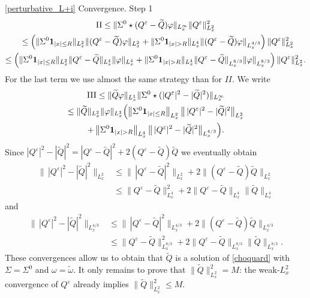 \begin{ProofOf}{\eqref{perturbative_L+i} Convergence. Step 1}
\bgroup
{}
\begin{multline*}
\textup{II}\leq\|\Sigma^{0}\star(Q^{\varepsilon}-\widetilde{Q})\varphi\|_{L_{x}^{\infty}}\|Q^{\varepsilon}\|_{L_{x}^{2}}^{2}\\
\shoveleft{\hphantom{\textup{II}}\leq\left(\|\Sigma^{0}\mathbf{1}_{|x|\leq R}\|_{L_{x}^{2}}\|(Q^{\varepsilon}-\widetilde{Q})\varphi\|_{L_{x}^{2}}+\|\Sigma^{0}\mathbf{1}_{|x|>R}\|_{L_{x}^{4}}\|(Q^{\varepsilon}-\widetilde{Q})\varphi\|_{L_{x}^{4/3}}\right)\|Q^{\varepsilon}\|_{L_{x}^{2}}^{2}}\\
\leq\left(\|\Sigma^{0}\mathbf{1}_{|x|\leq R}\|_{L_{x}^{2}}\|Q^{\varepsilon}-\widetilde{Q}\|_{L_{x}^{4}}\|\varphi\|_{L_{x}^{4}}+\|\Sigma^{0}\mathbf{1}_{|x|>R}\|_{L_{x}^{4}}\|Q^{\varepsilon}-\widetilde{Q}\|_{L_{x}^{8/3}}\|\varphi\|_{L_{x}^{8/3}}\right)\|Q^{\varepsilon}\|_{L_{x}^{2}}^{2}.
\end{multline*}
\egroup
For the last term we use almost the same strategy than for $II$. We write
\begin{multline*}
\textup{III}\leq\|\widetilde{Q}\varphi\|_{L_{x}^{1}}\|\Sigma^{0}\star(|Q^{\varepsilon}|^{2}-|\widetilde{Q}|^{2})\|_{L_{x}^{\infty}}\\
\leq\|\widetilde{Q}\|_{L_{x}^{2}}\|\varphi\|_{L_{x}^{2}}\Bigl(\left\|\Sigma^{0}\mathbf{1}_{|x|\leq R}\right\|_{L_{x}^{2}}\bigl\|\,|Q^{\varepsilon}|^{2}-|\widetilde{Q}|^{2}\bigr\|_{L_{x}^{2}}\\
+\left\|\Sigma^{0}\mathbf{1}_{|x|>R}\right\|_{L_{x}^{4}}\bigl\|\,|Q^{\varepsilon}|^{2}-|\widetilde{Q}|^{2}\bigr\|_{L_{x}^{4/3}}\Bigr).
\end{multline*}
Since $|Q^{\varepsilon}|^{2}-|\widetilde{Q}|^{2}=|Q^{\varepsilon}-\widetilde{Q}|^{2}+2(Q^{\varepsilon}-\widetilde{Q})\widetilde{Q}$ we eventually obtain
\begin{align*}
\bigl\|\,|Q^{\varepsilon}|^{2}-|\widetilde{Q}|^{2}\bigr\|_{L_{x}^{2}}&\leq\bigl\|\,|Q^{\varepsilon}-\widetilde{Q}|^{2}\bigr\|_{L_{x}^{2}}+2\bigl\|(Q^{\varepsilon}-\widetilde{Q})\widetilde{Q}\bigr\|_{L_{x}^{2}}\\
&\leq\bigl\|Q^{\varepsilon}-\widetilde{Q}\bigr\|_{L_{x}^{4}}^{2}+2\bigl\|Q^{\varepsilon}-\widetilde{Q}\bigr\|_{L_{x}^{4}}\bigl\|\widetilde{Q}\bigr\|_{L_{x}^{4}}
\end{align*}
and
\begin{align*}
\bigl\|\,|Q^{\varepsilon}|^{2}-|\widetilde{Q}|^{2}\bigr\|_{L_{x}^{4/3}}&\leq\bigl\|\,|Q^{\varepsilon}-\widetilde{Q}|^{2}\bigr\|_{L_{x}^{4/3}}+2\bigl\|(Q^{\varepsilon}-\widetilde{Q})\widetilde{Q}\bigr\|_{L_{x}^{4/3}}\\
&\leq\bigl\|Q^{\varepsilon}-\widetilde{Q}\bigr\|_{L_{x}^{8/3}}^{2}+2\bigl\|Q^{\varepsilon}-\widetilde{Q}\bigr\|_{L_{x}^{8/3}}\bigl\|\widetilde{Q}\bigr\|_{L_{x}^{8/3}}.
\end{align*}
These convergences allow us to obtain that $\widetilde{Q}$ is a solution of \eqref{choquard} with $\Sigma=\Sigma^{0}$ and $\omega=\widetilde{\omega}$. It only remains to prove that $\|\widetilde{Q}\|_{L_{x}^{2}}^{2}=M$: the weak-$L_{x}^{2}$ convergence of $Q^{\varepsilon}$ already implies $\|\widetilde{Q}\|_{L_{x}^{2}}^{2}\leq M$.


\end{ProofOf}
